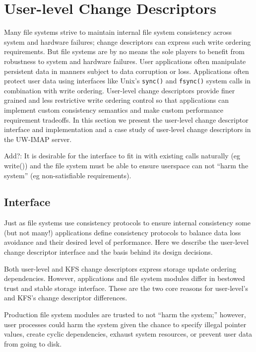 \section{User-level Change Descriptors}
\label{sec:opgroup}


Many file systems strive to maintain internal file system consistency
across system and hardware failures; change descriptors can express
such write ordering requirements. But file systems are by no means the
sole players to benefit from robustness to system and hardware
failures. User applications often manipulate persistent data in
manners subject to data corruption or loss. Applications often protect
user data using interfaces like Unix's \texttt{sync()} and
\texttt{fsync()} system calls in combination with write ordering.
User-level change descriptors provide finer grained and less
restrictive write ordering control so that applications can implement
custom consistency semantics and make custom performance requirement
tradeoffs. In this section we present the user-level change descriptor
interface and implementation and a case study of user-level change
descriptors in the UW-IMAP server.

Add?: It is desirable for the interface to fit in with existing calls
naturally (eg write()) and the file system must be able to ensure
userspace can not ``harm the system'' (eg non-satisfiable
requirements).

\subsection{Interface}

Just as file systems use consistency protocols to ensure internal
consistency some (but not many!) applications define consistency
protocols to balance data loss avoidance and their desired level of
performance. Here we describe the user-level change descriptor
interface and the basis behind its design decisions.

Both user-level and KFS change descriptors express storage update
ordering dependencies. However, applications and file system modules
differ in bestowed trust and stable storage interface. These are the
two core reasons for user-level's and KFS's change descriptor
differences.

Production file system modules are trusted to not ``harm the system;''
however, user processes could harm the system given the chance to
specify illegal pointer values, create cyclic dependencies, exhaust
system resources, or prevent user data from going to disk.

